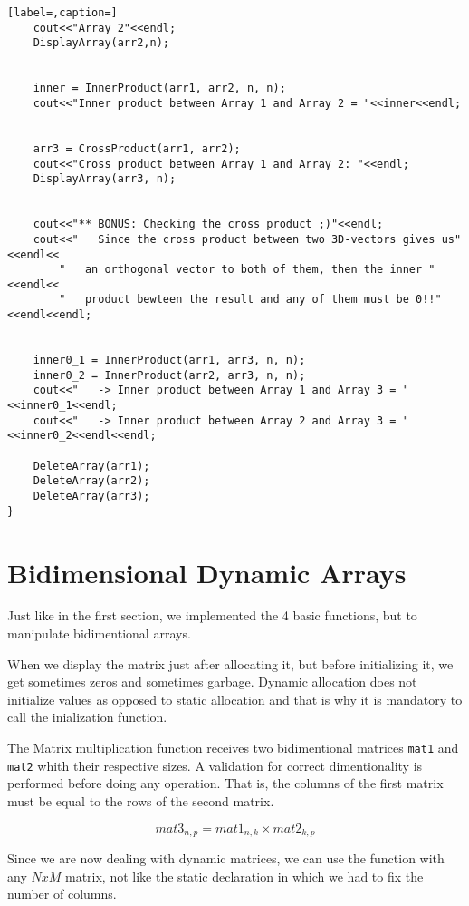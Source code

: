 \documentclass{article}
\begin{document}
\begin{lstlisting}[label=,caption=]
	cout<<"Array 2"<<endl;
	DisplayArray(arr2,n);


	inner = InnerProduct(arr1, arr2, n, n);
	cout<<"Inner product between Array 1 and Array 2 = "<<inner<<endl;


	arr3 = CrossProduct(arr1, arr2);
	cout<<"Cross product between Array 1 and Array 2: "<<endl;
	DisplayArray(arr3, n);


	cout<<"** BONUS: Checking the cross product ;)"<<endl;
	cout<<"   Since the cross product between two 3D-vectors gives us"<<endl<<
		"   an orthogonal vector to both of them, then the inner "<<endl<<
		"   product bewteen the result and any of them must be 0!!"<<endl<<endl;


	inner0_1 = InnerProduct(arr1, arr3, n, n);
	inner0_2 = InnerProduct(arr2, arr3, n, n);
	cout<<"   -> Inner product between Array 1 and Array 3 = "<<inner0_1<<endl;
	cout<<"   -> Inner product between Array 2 and Array 3 = "<<inner0_2<<endl<<endl;

	DeleteArray(arr1);
	DeleteArray(arr2);
	DeleteArray(arr3);
}
\end{lstlisting} 


\section{Bidimensional Dynamic Arrays}

Just like in the first section, we implemented the 4 basic functions, but to 
manipulate bidimentional arrays.

When we display the matrix just after allocating it, but before initializing it,
we get sometimes zeros and sometimes garbage. Dynamic allocation does not initialize
values as opposed to static allocation and that is why it is mandatory to call
the inialization function.

The Matrix multiplication function receives two bidimentional matrices \verb+mat1+ and
\verb+mat2+ whith their respective sizes. A validation for correct dimentionality 
is performed before doing any operation. That is, the columns of the first matrix
must be equal to the rows of the second matrix. 

\begin{equation*}
mat3_{n,p} = mat1_{n,k} \times mat2_{k,p}
\end{equation*} 

Since we are now dealing with dynamic matrices, we can use the function with
any $NxM$ matrix, not like the static declaration in which we had to fix the number
of columns.
\end{document}
